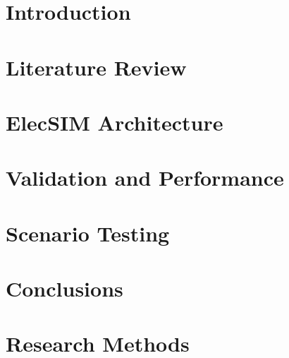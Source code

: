 \documentclass[sigconf]{acmart}
\begin{document}
%
\maketitle


\section{Introduction}


\section{Literature Review}\label{Literature Review}

\section{ElecSIM Architecture} \label{Model}



\section{Validation and Performance}\label{Valdiation and Performance}



\section{Scenario Testing}\label{Scenario Testing}




\section{Conclusions}\label{Conclusion}





%




%



% 
\appendix


\section{Research Methods}

\end{document}
